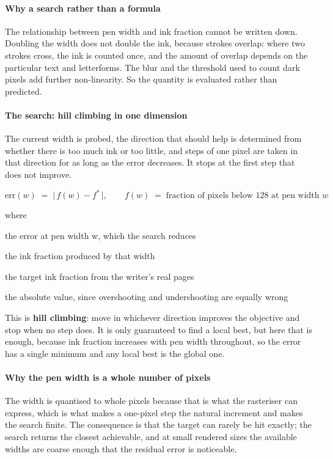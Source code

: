 \paragraph{Why a search rather than a formula}
The relationship between pen width and ink fraction cannot be written down. Doubling the width does not double the ink, because strokes overlap: where two strokes cross, the ink is counted once, and the amount of overlap depends on the particular text and letterforms. The blur and the threshold used to count dark pixels add further non-linearity. So the quantity is evaluated rather than predicted.


\paragraph{The search: hill climbing in one dimension}
The current width is probed, the direction that should help is determined from whether there is too much ink or too little, and steps of one pixel are taken in that direction for as long as the error decreases. It stops at the first step that does not improve.


\begin{equation}
\mathrm{err}(w) \;=\; \big|\, f(w) - f^{*} \,\big|, \qquad f(w) \;=\; \text{fraction of pixels below 128 at pen width } w
\end{equation}

\noindent where
\begin{description}[leftmargin=2.4em,style=nextline,font=\normalfont\ttfamily]\setlength\itemsep{1pt}
  \item[{$\mathrm{err}(w)$}] \normalfont the error at pen width w, which the search reduces
  \item[{$f(w)$}] \normalfont the ink fraction produced by that width
  \item[{$f^{*}$}] \normalfont the target ink fraction from the writer's real pages
  \item[{$|\cdot|$}] \normalfont the absolute value, since overshooting and undershooting are equally wrong
\end{description}
This is \textbf{hill climbing}: move in whichever direction improves the objective and stop when no step does. It is only guaranteed to find a local best, but here that is enough, because ink fraction increases with pen width throughout, so the error has a single minimum and any local best is the global one.


\paragraph{Why the pen width is a whole number of pixels}
The width is quantised to whole pixels because that is what the rasteriser can express, which is what makes a one-pixel step the natural increment and makes the search finite. The consequence is that the target can rarely be hit exactly; the search returns the closest achievable, and at small rendered sizes the available widths are coarse enough that the residual error is noticeable.


